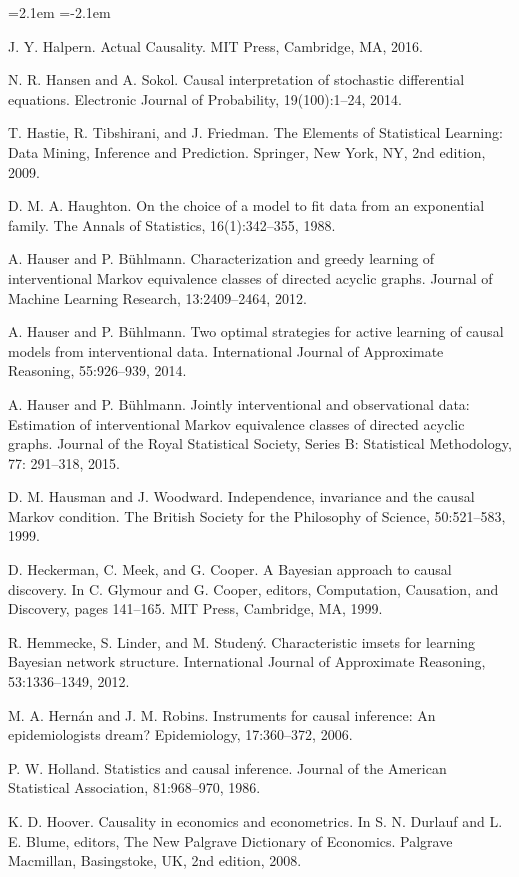 \begin{list}{}{\leftmargin=2.1em
 \itemindent=-2.1em\parsep=0pt\itemsep=3pt}
\item J. Y. Halpern. Actual Causality. MIT Press, Cambridge, MA, 2016.
\item N. R. Hansen and A. Sokol. Causal interpretation of stochastic differential equations. Electronic Journal of Probability, 19(100):1--24, 2014.
\item T. Hastie, R. Tibshirani, and J. Friedman. The Elements of Statistical Learning: Data Mining, Inference and Prediction. Springer, New York, NY, 2nd edition, 2009.
\item D. M. A. Haughton. On the choice of a model to fit data from an exponential family. The Annals of Statistics, 16(1):342--355, 1988.
\item A. Hauser and P. Bühlmann. Characterization and greedy learning of interventional Markov equivalence classes of directed acyclic graphs. Journal of Machine Learning Research, 13:2409--2464, 2012.
\item A. Hauser and P. Bühlmann. Two optimal strategies for active learning of causal models from interventional data. International Journal of Approximate Reasoning, 55:926--939, 2014.
\item A. Hauser and P. Bühlmann. Jointly interventional and observational data: Estimation of interventional Markov equivalence classes of directed acyclic graphs. Journal of the Royal Statistical Society, Series B: Statistical Methodology, 77: 291--318, 2015.
\item D. M. Hausman and J. Woodward. Independence, invariance and the causal Markov condition. The British Society for the Philosophy of Science, 50:521--583, 1999.
\item D. Heckerman, C. Meek, and G. Cooper. A Bayesian approach to causal discovery. In C. Glymour and G. Cooper, editors, Computation, Causation, and Discovery, pages 141--165. MIT Press, Cambridge, MA, 1999.
\item R. Hemmecke, S. Linder, and M. Studený. Characteristic imsets for learning Bayesian network structure. International Journal of Approximate Reasoning, 53:1336--1349, 2012.
\item M. A. Hernán and J. M. Robins. Instruments for causal inference: An epidemiologists dream? Epidemiology, 17:360--372, 2006.
\item P. W. Holland. Statistics and causal inference. Journal of the American Statistical Association, 81:968--970, 1986.
\item K. D. Hoover. Causality in economics and econometrics. In S. N. Durlauf and L. E. Blume, editors, The New Palgrave Dictionary of Economics. Palgrave Macmillan, Basingstoke, UK, 2nd edition, 2008.

\end{list}
